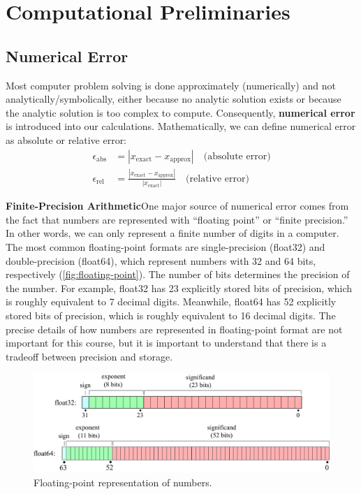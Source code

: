 \section{Computational Preliminaries}
\subsection{Numerical Error}
Most computer problem solving is done approximately (numerically) and not analytically/symbolically, either because no analytic solution exists or because the analytic solution is too complex to compute. Consequently, \textbf{numerical error} is introduced into our calculations. Mathematically, we can define numerical error as absolute or relative error:
\begin{align*}
    \epsilon_{\text{abs}} &= |x_{\text{exact}} - x_{\text{approx}}| \quad \text{(absolute error)} \\
    \epsilon_{\text{rel}} &= \frac{|x_{\text{exact}} - x_{\text{approx}}|}{|x_{\text{exact}}|} \quad \text{(relative error)}
\end{align*}

\textbf{Finite-Precision Arithmetic}\quad One major source of numerical error comes from the fact that numbers are represented with ``floating point'' or ``finite precision.'' In other words, we can only represent a finite number of digits in a computer. The most common floating-point formats are single-precision (float32) and double-precision (float64), which represent numbers with 32 and 64 bits, respectively (\autoref{fig:floating-point}). The number of bits determines the precision of the number. For example, float32 has 23 explicitly stored bits of precision, which is roughly equivalent to 7 decimal digits. Meanwhile, float64 has 52 explicitly stored bits of precision, which is roughly equivalent to 16 decimal digits. The precise details of how numbers are represented in floating-point format are not important for this course, but it is important to understand that there is a tradeoff between precision and storage.

\begin{figure}[!h]
    \centering
    \includegraphics[width=.7\textwidth]{figs/computation/floating-point.pdf}
    \caption{Floating-point representation of numbers.}
    \label{fig:floating-point}
\end{figure}

